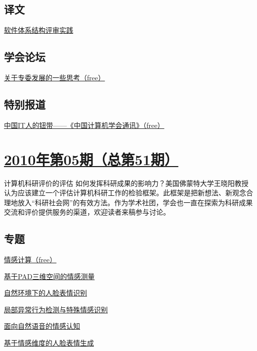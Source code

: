 \documentclass[a4paper]{article}
\begin{document}
\subsection{译文}
\href{http://history.ccf.org.cn/resources/1190201776262/2010/06/12/201006-12.pdf}{软件体系结构评审实践}

\subsection{学会论坛}
\href{http://history.ccf.org.cn/resources/1190201776262/2010/06/12/201006-14.pdf}{关于专委发展的一些思考（free）}

\subsection{特别报道}
\href{http://history.ccf.org.cn/resources/1190201776262/2010/06/12/201006-13.pdf}{中国IT人的钮带——《中国计算机学会通讯》（free）}


\section{\href{http://history.ccf.org.cn/sites/ccf/jsjtbbd.jsp?contentId=2547160900037}{\textbf{2010年第05期（总第51期）}}}
计算机科研评价的评估 如何发挥科研成果的影响力？美国佛蒙特大学王晓阳教授认为应该建立一个评估计算机科研工作的检验框架。此框架是把新想法、新观念合理地放入“科研社会网”的有效方法。作为学术社团，学会也一直在探索为科研成果交流和评价提供服务的渠道，欢迎读者来稿参与讨论。
\subsection{专题}
\href{http://history.ccf.org.cn/resources/1190201776262/2010/05/12/201005-1zhuanti-free.pdf}{情感计算（free）}

\href{http://history.ccf.org.cn/resources/1190201776262/2010/05/12/201005-2.pdf}{基于PAD三维空间的情感测量}

\href{http://history.ccf.org.cn/resources/1190201776262/2010/05/21/201005-3.pdf}{自然环境下的人脸表情识别}

\href{http://history.ccf.org.cn/resources/1190201776262/2010/05/12/201005-4.pdf}{局部异常行为检测与特殊情感识别}

\href{http://history.ccf.org.cn/resources/1190201776262/2010/05/21/201005-5.pdf}{面向自然语音的情感认知}

\href{http://history.ccf.org.cn/resources/1190201776262/2010/05/21/201005-6.pdf}{基于情感维度的人脸表情生成}
\end{document}
